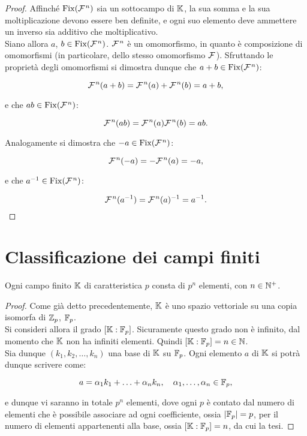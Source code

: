 \documentclass[11pt]{scrbook}
\begin{document}
\begin{proof}
    Affinché $\operatorname{Fix}(\mathcal{F}{\mkern 1.5mu}^n)$ sia un sottocampo di $\mathbb{K}$,
    la sua somma e la sua moltiplicazione devono essere ben
    definite, e ogni suo elemento deve ammettere un inverso
    sia additivo che moltiplicativo. \\

    Siano allora $a$, $b \in \operatorname{Fix}(\mathcal{F}{\mkern 1.5mu}^n)$.
    $\mathcal{F}{\mkern 1.5mu}^n$ è un omomorfismo, in quanto è composizione
    di omomorfismi (in particolare, dello stesso omomorfismo
    $\mathcal{F}{\mkern 1.5mu}$). Sfruttando le proprietà
    degli omomorfismi si dimostra dunque
    che $a+b \in \operatorname{Fix}(\mathcal{F}{\mkern 1.5mu}^n)$:

    \[ \mathcal{F}{\mkern 1.5mu}^n(a+b) = \mathcal{F}{\mkern 1.5mu}^n(a) + \mathcal{F}{\mkern 1.5mu}^n(b) = a+b, \]

    \vskip 0.1in

    e che $ab \in \operatorname{Fix}(\mathcal{F}{\mkern 1.5mu}^n)$:

    \[ \mathcal{F}{\mkern 1.5mu}^n(ab) = \mathcal{F}{\mkern 1.5mu}^n(a)\mathcal{F}{\mkern 1.5mu}^n(b) = ab. \]

    \vskip 0.1in

    Analogamente si dimostra che $-a \in \operatorname{Fix}(\mathcal{F}{\mkern 1.5mu}^n)$:

    \[ \mathcal{F}{\mkern 1.5mu}^n(-a) = -\mathcal{F}{\mkern 1.5mu}^n(a) = -a, \]

    \vskip 0.1in

    e che $a^{-1} \in \operatorname{Fix}(\mathcal{F}{\mkern 1.5mu}^n)$:

    \[ \mathcal{F}{\mkern 1.5mu}^n(a^{-1}) = \mathcal{F}{\mkern 1.5mu}^n(a)^{-1} = a^{-1}. \]

\end{proof}


\section{Classificazione dei campi finiti}

\begin{theorem}
    Ogni campo finito $\mathbb{K}$ di caratteristica $p$ consta
    di $p^n$ elementi, con $n \in \mathbb N^+$.
\end{theorem}

\begin{proof}
    Come già detto precedentemente, $\mathbb{K}$ è uno
    spazio vettoriale su una copia isomorfa di $\mathbb{Z}_p$,
    $\mathbb{F}_p$. \\

    Si consideri allora il grado $[\mathbb{K} : \mathbb{F}_p]$. Sicuramente
    questo grado non è infinito, dal momento che $\mathbb{K}$ non
    ha infiniti elementi. Quindi $[\mathbb{K} : \mathbb{F}_p] = n \in \mathbb N$. \\

    Sia dunque $(k_1, k_2, \ldots, k_n)$ una base di $\mathbb{K}$
    su $\mathbb{F}_p$. Ogni elemento $a$ di $\mathbb{K}$ si potrà dunque scrivere
    come:

    \[ a = \alpha_1 k_1 + \ldots + \alpha_n k_n, \quad \alpha_1, \ldots, \alpha_n \in \mathbb{F}_p,\]

    \vskip 0.1in

    e dunque vi saranno in totale $p^n$
    elementi, dove ogni $p$ è contato dal numero di elementi che è
    possibile associare ad ogni coefficiente, ossia $\left|\mathbb{F}_p\right| = p$,
    per il numero di elementi appartenenti alla base, ossia $[\mathbb{K} : \mathbb{F}_p] =
        n$, da cui la tesi.
\end{proof}
\end{document}

